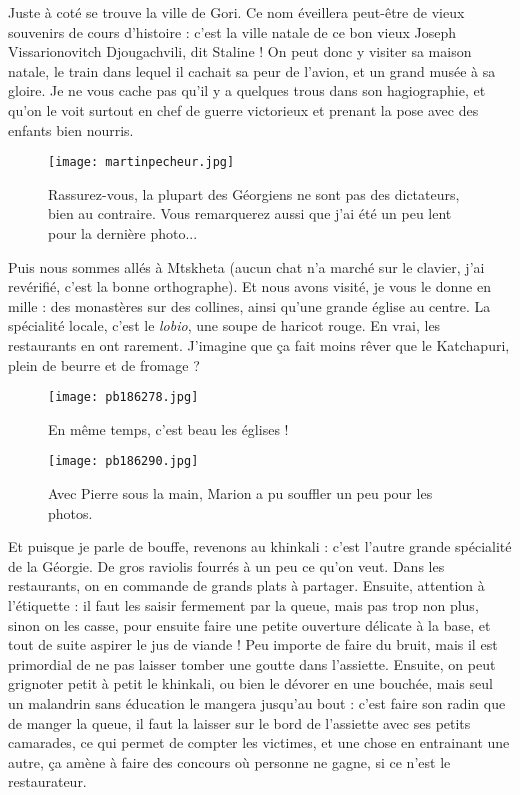 \documentclass{book}
\begin{document}
Juste à coté se trouve la ville de Gori. Ce nom éveillera peut-être de vieux souvenirs de cours d'histoire : c'est la ville natale de ce bon vieux Joseph Vissarionovitch Djougachvili, dit Staline ! On peut donc y visiter sa maison natale, le train dans lequel il cachait sa peur de l'avion, et un grand musée à sa gloire. Je ne vous cache pas qu'il y a quelques trous dans son hagiographie, et qu'on le voit surtout en chef de guerre victorieux et prenant la pose avec des enfants bien nourris.




\begin{figure}[h]
\centering
\texttt{[image: martinpecheur.jpg]}
\caption*{Rassurez-vous, la plupart des Géorgiens ne sont pas des dictateurs, bien au contraire. Vous remarquerez aussi que j'ai été un peu lent pour la dernière photo...}
\end{figure}

Puis nous sommes allés à Mtskheta (aucun chat n'a marché sur le clavier, j'ai revérifié, c'est la bonne orthographe). Et nous avons visité, je vous le donne en mille : des monastères sur des collines, ainsi qu'une grande église au centre. La spécialité locale, c'est le \emph{lobio}, une soupe de haricot rouge. En vrai, les restaurants en ont rarement. J'imagine que ça fait moins rêver que le Katchapuri, plein de beurre et de fromage ?




\begin{figure}[h]
\centering
\texttt{[image: pb186278.jpg]}
\caption*{En même temps, c'est beau les églises !}
\end{figure}


\begin{figure}[h]
\centering
\texttt{[image: pb186290.jpg]}
\caption*{Avec Pierre sous la main, Marion a pu souffler un peu pour les photos.}
\end{figure}

Et puisque je parle de bouffe, revenons au khinkali : c'est l'autre grande spécialité de la Géorgie. De gros raviolis fourrés à un peu ce qu'on veut. Dans les restaurants, on en commande de grands plats à partager. Ensuite, attention à l'étiquette : il faut les saisir fermement par la queue, mais pas trop non plus, sinon on les casse, pour ensuite faire une petite ouverture délicate à la base, et tout de suite aspirer le jus de viande ! Peu importe de faire du bruit, mais il est primordial de ne pas laisser tomber une goutte dans l'assiette. Ensuite, on peut grignoter petit à petit le khinkali, ou bien le dévorer en une bouchée, mais seul un malandrin sans éducation le mangera jusqu'au bout : c'est faire son radin que de manger la queue, il faut la laisser sur le bord de l'assiette avec ses petits camarades, ce qui permet de compter les victimes, et une chose en entrainant une autre, ça amène à faire des concours où personne ne gagne, si ce n'est le restaurateur.
\end{document}

